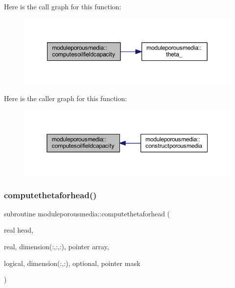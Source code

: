 Here is the call graph for this function\+:\nopagebreak
\begin{figure}[H]
\begin{center}
\leavevmode
\includegraphics[width=349pt]{namespacemoduleporousmedia_a5bc710495ce11815ae382078999351b3_cgraph}
\end{center}
\end{figure}
Here is the caller graph for this function\+:\nopagebreak
\begin{figure}[H]
\begin{center}
\leavevmode
\includegraphics[width=350pt]{namespacemoduleporousmedia_a5bc710495ce11815ae382078999351b3_icgraph}
\end{center}
\end{figure}
\mbox{\label{namespacemoduleporousmedia_a01d07c2251d4f4c42f4f695af824a478}} 
\subsubsection{\texorpdfstring{computethetaforhead()}{computethetaforhead()}}
{\footnotesize\ttfamily subroutine moduleporousmedia\+::computethetaforhead (\begin{DoxyParamCaption}\item[{real}]{head,  }\item[{real, dimension(\+:,\+:,\+:), pointer}]{array,  }\item[{logical, dimension(\+:,\+:), optional, pointer}]{mask }\end{DoxyParamCaption})\hspace{0.3cm}{\ttfamily [private]}}

